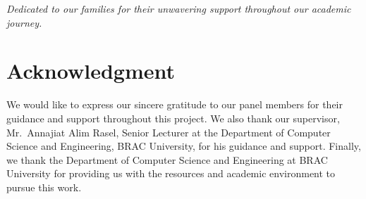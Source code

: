 \documentclass[12pt,a4paper]{report}
\begin{document}
\vspace{3cm}
\begin{center}
\textit{Dedicated to our families for their unwavering support throughout our academic journey.}
\end{center}

\newpage
\thispagestyle{empty}

\chapter*{Acknowledgment}
{}

We would like to express our sincere gratitude to our panel members for their guidance and support throughout this project. We also thank our supervisor, Mr.\ Annajiat Alim Rasel, Senior Lecturer at the Department of Computer Science and Engineering, BRAC University, for his guidance and support. Finally, we thank the Department of Computer Science and Engineering at BRAC University for providing us with the resources and academic environment to pursue this work.

\newpage
\singlespacing
\setcounter{page}{1}
\tableofcontents
\newpage
{}
{}
\listoftables
\newpage
{}
{}
\listoffigures
\newpage
\end{document}
